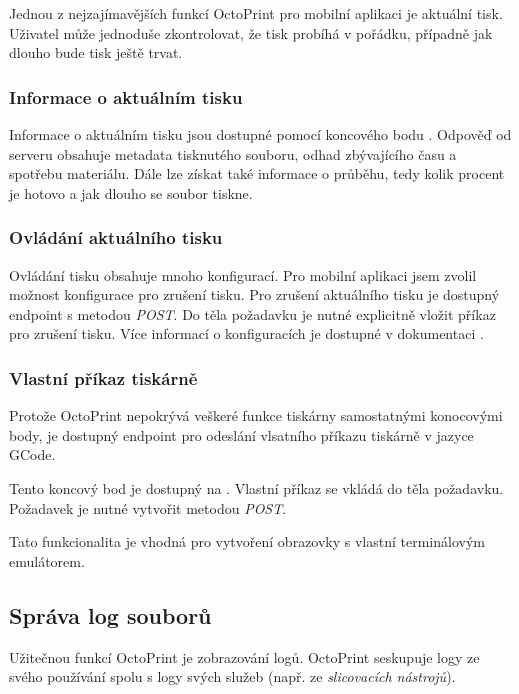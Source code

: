 Jednou z nejzajímavějších funkcí OctoPrint pro mobilní aplikaci je aktuální tisk.
Uživatel může jednoduše zkontrolovat, že tisk probíhá v pořádku, případně jak dlouho bude tisk ještě trvat.

\subsubsection*{Informace o aktuálním tisku}

Informace o aktuálním tisku jsou dostupné pomocí koncového bodu .
Odpověď od serveru obsahuje metadata tisknutého souboru, odhad zbývajícího času a spotřebu materiálu.
Dále lze získat také informace o průběhu, tedy kolik procent je hotovo a jak dlouho se soubor tiskne.

\subsubsection*{Ovládání aktuálního tisku}

Ovládání tisku obsahuje mnoho konfigurací.
Pro mobilní aplikaci jsem zvolil možnost konfigurace pro zrušení tisku.
Pro zrušení aktuálního tisku je dostupný endpoint  s metodou \textit{POST}.
Do těla požadavku je nutné explicitně vložit příkaz pro zrušení tisku.
Více informací o konfiguracích je dostupné v dokumentaci \cite{octoprint-docs-job}.

\subsubsection*{Vlastní příkaz tiskárně}

Protože OctoPrint nepokrývá veškeré funkce tiskárny samostatnými konocovými body, je dostupný endpoint pro odeslání vlsatního příkazu tiskárně v jazyce GCode.

Tento koncový bod je dostupný na .
Vlastní příkaz se vkládá do těla požadavku.
Požadavek je nutné vytvořit metodou \textit{POST}.

Tato funkcionalita je vhodná pro vytvoření obrazovky s vlastní terminálovým emulátorem.

\subsection{Správa log souborů}

Užitečnou funkcí OctoPrint je zobrazování logů.
OctoPrint seskupuje logy ze svého používání spolu s logy svých služeb (např. ze \textit{slicovacích nástrojů}).

